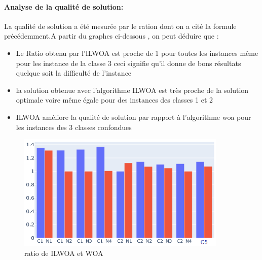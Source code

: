 \documentclass[12pt]{article}
\begin{document}
 \paragraph{Analyse de la qualité de solution: }La qualité de solution a été mesurée par le ration dont on a cité la formule précédemment.A partir du graphes ci-dessous , on peut déduire que :
 \begin{itemize}
     \item Le Ratio obtenu par l’ILWOA est proche de 1 pour toutes les instances même pour les instance de la classe 3 ceci signifie qu’il donne de bons résultats quelque soit la difficulté de l’instance 
     \item la solution obtenue avec l’algorithme ILWOA est très proche de la solution optimale voire même égale pour des instances des classes 1 et 2 
     \item ILWOA améliore la qualité de solution par rapport à l’algorithme woa pour les instances des 3 classes confondues
 \end{itemize}
 \begin{figure}[h!]
     \centering
      \includegraphics[width=10cm]{../figures/ratio_ilwoa_woa}
      \caption{ratio de ILWOA et WOA}
  \end{figure}
\end{document}
